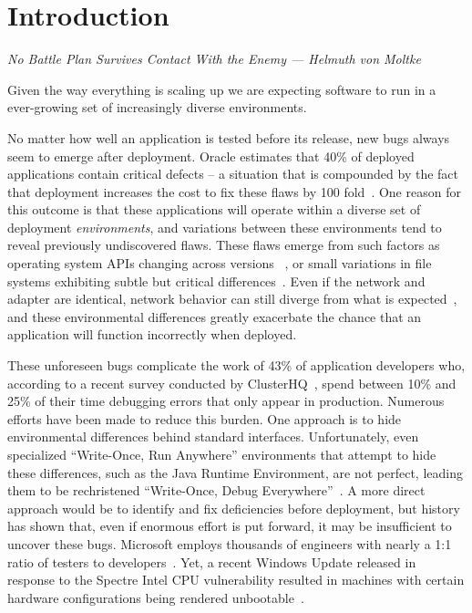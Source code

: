 \chapter{Introduction}
\label{chap:intro}
\textit{No Battle Plan Survives Contact With the Enemy --- Helmuth von Moltke}

Given the way everything is scaling up we are expecting software to run in
a ever-growing set of increasingly diverse environments.

No matter how well an application is tested before its release,
new bugs always seem to emerge after deployment.
Oracle estimates that 40\% of deployed applications
contain critical defects -- a situation that is compounded
by the fact that deployment
increases the cost to fix these flaws by 100 fold~\cite{OracleAppQuality}.
One reason for this outcome
is that these applications will operate within a diverse set of
deployment \emph{environments},
and variations between these environments tend to
reveal previously undiscovered flaws.
These flaws emerge from
such factors as
operating system APIs changing across versions
~\cite{LinuxGlibcChanges, WinAPICompat, MuslDifferences},
or small variations in file systems exhibiting subtle but critical
differences~\cite{EXT4Layout, AppleHFS, WindowsNTFS}.
Even if the network and adapter are identical,
network behavior can still diverge from what is expected~\cite{vbox,
NMAPOSDifferences, VMWareNATFailure},
and these environmental differences greatly exacerbate
the chance that an application will function incorrectly when deployed.

These unforeseen bugs
complicate the work of 43\% of application developers who, according to a
recent survey conducted by ClusterHQ~\cite{ClusterHQSurvey},
spend between 10\% and 25\% of their time
debugging errors that only appear in production.
Numerous efforts have been made to reduce this burden.
One approach
is to hide environmental differences behind standard interfaces.
Unfortunately,
even specialized ``Write-Once, Run Anywhere'' environments
that attempt to hide these differences,
such as the Java Runtime Environment,
are not perfect,
leading them to be rechristened ``Write-Once, Debug Everywhere''~\cite{WODE}.
A more direct approach would be
to identify and fix deficiencies before deployment,
but history has shown that,
even if enormous effort is put forward,
it may be insufficient to uncover these bugs.
Microsoft employs thousands of engineers with nearly a
1:1 ratio of testers to developers~\cite{Page2009}.
Yet, a recent Windows Update released
in response to the Spectre Intel CPU vulnerability
resulted in machines with certain hardware configurations
being rendered unbootable~\cite{kb4056892}.

